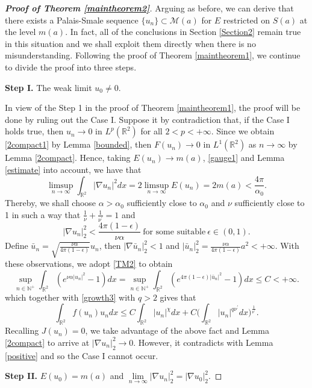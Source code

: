\documentclass[11pt]{amsart}
\numberwithin{equation}{section}
\theoremstyle{definition}
\newcommand{\R}{\mathbb{R}}
\begin{document}
\begin{proof}[\emph{\textbf{Proof of Theorem \ref{maintheorem2}}}]
Arguing as before, we can derive that there exists a Palais-Smale sequence
$\{u_n\}\subset \mathcal{M}(a)$ for $E$ restricted on $S(a)$
at the level $m(a)$. In fact, all of the conclusions in Section \ref{Section2}
remain true in this situation and we shall exploit them directly when there is no misunderstanding.
Following the proof of Theorem \ref{maintheorem1}, we continue to divide the proof into three steps.

\textbf{Step I.} The weak limit $u_0\neq0$.

In view of the Step 1 in the proof of Theorem \ref{maintheorem1},
the proof will be done by ruling out the Case I. Suppose it by contradiction that,
if the Case I holds true, then $u_n\to0$ in $L^p(\R^2)$ for all $2<p<+\infty$.
Since we obtain \eqref{2compact1} by Lemma \ref{bounded},
then $F(u_n)\to 0$ in $L^1(\R^2)$ as $n\to\infty$ by Lemma \ref{2compact}.
Hence, taking $E(u_n)\to m(a)$, \eqref{gauge1} and Lemma \ref{estimate} into account, we have that
\[
\limsup_{n\to\infty}\int_{\R^2}|\nabla u_n|^2dx=2\limsup_{n\to\infty}E(u_n)=2
m(a)<\frac{ 4 \pi}{\alpha_0}.
\]
Thereby, we shall choose $\alpha>\alpha_0$ sufficiently close to $\alpha_0$ and $\nu$ sufficiently close to 1 in such
a way that $\frac1\nu+\frac1{\nu^\prime}=1$ and
\[
 |\nabla u_n|_2^2  <\frac{4\pi(1-\epsilon)}{\nu\alpha}~\text{for some suitable}~\epsilon\in(0,1).
\]
Define $\bar{u}_n=\sqrt{\frac{\nu\alpha}{4\pi(1-\epsilon)}}u_n$, then $|\nabla \bar{u}_n|_2^2<1$ and $|\bar{u}_n|_2^2
=\frac{\nu\alpha}{4\pi(1-\epsilon)}a^2<+\infty$.
With these observations, we adopt \eqref{TM2} to obtain
\[
\sup_{n\in \mathbb{N}^+}\int_{\R^2}(e^{\nu\alpha |u_n|^2}-1)dx=
\sup_{n\in \mathbb{N}^+}\int_{\R^2}(e^{4\pi(1-\epsilon)|\bar{u}_n|^2}-1)dx\leq C<+\infty.
\]
which together with \eqref{growth3} with $q>2$ gives that
\[
\int_{\R^2}f(u_n)u_ndx\leq
C \int_{\R^2}|u_n|^{\chi}dx+C\bigg(\int_{\R^2}|u_n|^{q\nu^\prime}dx\bigg)^{\frac1{\nu^\prime}}.
\]
Recalling $J(u_n)=0$, we take advantage of the above fact and Lemma \ref{2compact}
to arrive at $|\nabla u_n|_2^2\to0$. However, it contradicts with Lemma
\ref{positive} and so the Case I cannot occur.

   \textbf{Step II.} $E(u_0)=m(a)$ and $\lim\limits_{n\to\infty}|\nabla u_n|_2^2=|\nabla u_0|_2^2$.


\end{proof}
\end{document}
